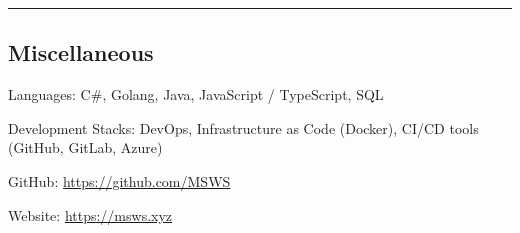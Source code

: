\documentclass[10pt,letterpaper]{article}
\newenvironment{indentsection}[1]%
{\begin{list}{}%
	{\setlength{\leftmargin}{#1}}%
	\item[]%
}
{\end{list}}
\begin{document}
\hrule
\vspace{-0.4em}

\subsection*{Miscellaneous}

\begin{indentsection}{\parindent}
    \begin{description*}
        \item[Languages:] C\#, Golang, Java, JavaScript / TypeScript, SQL
        \item[Development Stacks:] DevOps, Infrastructure as Code (Docker), CI/CD tools (GitHub, GitLab, Azure)
        \item[GitHub:] \href{https://github.com/MSWS}{https://github.com/MSWS}
        \item[Website:] \href{https://msws.xyz}{https://msws.xyz}
    \end{description*}
\end{indentsection}
\end{document}
